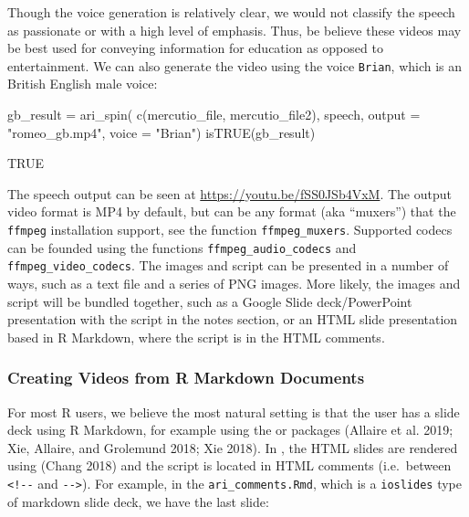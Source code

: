 Though the voice generation is relatively clear, we would not classify
the speech as passionate or with a high level of emphasis. Thus, be
believe these videos may be best used for conveying information for
education as opposed to entertainment. We can also generate the video
using the voice \texttt{Brian}, which is an British English male voice:

\begin{Schunk}
\begin{Sinput}
gb_result = ari_spin(
  c(mercutio_file, mercutio_file2),
  speech, output = "romeo_gb.mp4", voice = "Brian")
isTRUE(gb_result)
\end{Sinput}
\end{Schunk}

\begin{Schunk}
\begin{Soutput}
[1] TRUE
\end{Soutput}
\end{Schunk}

The speech output can be seen at \url{https://youtu.be/fSS0JSb4VxM}. The
output video format is MP4 by default, but can be any format (aka
``muxers'') that the \texttt{ffmpeg} installation support, see the
function \texttt{ffmpeg\_muxers}. Supported codecs can be founded using
the functions \texttt{ffmpeg\_audio\_codecs} and
\texttt{ffmpeg\_video\_codecs}. The images and script can be presented
in a number of ways, such as a text file and a series of PNG images.
More likely, the images and script will be bundled together, such as a
Google Slide deck/PowerPoint presentation with the script in the notes
section, or an HTML slide presentation based in R Markdown, where the
script is in the HTML comments.

\hypertarget{creating-videos-from-r-markdown-documents}{%
\subsubsection{Creating Videos from R Markdown
Documents}\label{creating-videos-from-r-markdown-documents}}

For most R users, we believe the most natural setting is that the user
has a slide deck using R Markdown, for example using the
 or  packages (Allaire et al. 2019;
Xie, Allaire, and Grolemund 2018; Xie 2018). In , the HTML
slides are rendered using  (Chang 2018) and the script
is located in HTML comments (i.e.~between \texttt{\textless{}!-\/-} and
\texttt{-\/-\textgreater{}}). For example, in the
\texttt{ari\_comments.Rmd}, which is a \texttt{ioslides} type of
markdown slide deck, we have the last slide:

